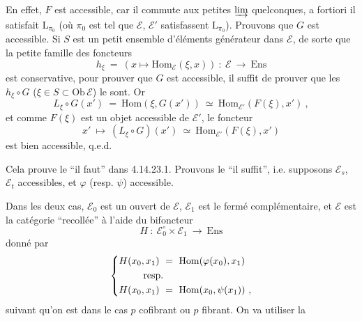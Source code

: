 \documentclass[11pt]{article}
\newcommand{\printedpage}[1]{\marginpar{\footnotesize p.~#1}}
\newcommand{\msp}[1]{\marginpar{\footnotesize [#1]}}
\newcommand{\Ens}{\mathrm{Ens}}
\newcommand{\Ob}{\mathrm{Ob}\,}
\newcommand{\Hom}{\mathrm{Hom}}
\begin{document}
\msp{page 412}

En effet, $F$ est accessible, car il commute aux petites $\varinjlim$ quelconques, a fortiori il satisfait $\mathrm{L}_{\pi_0}$ (où $\pi_0$ est tel que $\mathcal{E}$, $\mathcal{E}'$ satisfassent $\mathrm{L}_{\pi_0}$). Prouvons que $G$ est accessible. Si $S$ est un
\printedpage{156}
petit ensemble d'éléments générateur dans $\mathcal{E}$, de sorte que la petite famille des foncteurs
\[
h_\xi\ =\ (x\longmapsto\Hom_{\mathcal{E}}(\xi,x))\ :\ \mathcal{E}\ \longrightarrow\ \Ens
\]
est conservative, pour prouver que $G$ est accessible, il suffit de prouver que les $h_\xi\circ G$ ($\xi\in S\subset\Ob\mathcal{E}$) le sont. Or
\[
L_\xi\circ G(x')\ =\ \Hom(\xi,G(x'))\ \simeq\ \Hom_{\mathcal{E}'}(F(\xi),x')\ , %
\]
et comme $F(\xi)$ est un objet accessible de $\mathcal{E}'$, le foncteur
\[
x'\ \longmapsto\ (L_\xi\circ G)(x')\ \simeq\ \Hom_{\mathcal{E}'}(F(\xi),x') %
\]
est bien accessible, q.e.d.

Cela prouve le “il faut” dans 4.14.23.1. Prouvons le “il suffit”, i.e. supposons $\mathcal{E}_s$, $\mathcal{E}_t$ accessibles, et $\varphi$ (resp. $\psi$) accessible.

\msp{page 413}

Dans les deux cas, $\mathcal{E}_0$ est un ouvert de $\mathcal{E}$, $\mathcal{E}_1$ est le fermé complémentaire, et $\mathcal{E}$ est la catégorie “recollée” à l'aide du bifoncteur
\[
H\ :\ \mathcal{E}_0^{\circ}\times\mathcal{E}_1\ \longrightarrow\ \Ens
\]
donné par
\[
\left\{
\begin{aligned}
H(x_0,x_1)\ &=\ \Hom(\varphi(x_0),x_1)\\
&\hspace{-2em}\text{resp.}\\
H(x_0,x_1)\ &=\ \Hom(x_0,\psi(x_1))\ ,
\end{aligned}
\right.
\]
suivant qu'on est dans le cas $p$ cofibrant ou $p$ fibrant. On va utiliser la
\end{document}
